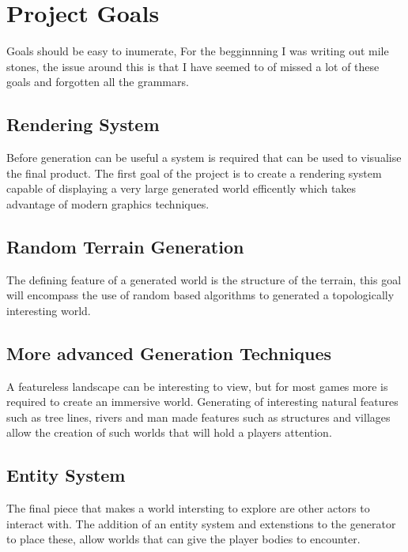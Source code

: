 \section{Project Goals}

Goals should be easy to inumerate, For the begginnning I was writing out mile
stones, the issue around this is that I have seemed to of missed a lot of these
goals and forgotten all the grammars.\\

\subsection{Rendering System}
Before generation can be useful a system is required that can be used to 
visualise the final product. The first goal of the project is to create a
rendering system capable of displaying a very large generated world efficently 
which takes advantage of modern graphics techniques.\\

\subsection{Random Terrain Generation}
The defining feature of a generated world is the structure of the terrain, this
goal will encompass the use of random based algorithms to generated a 
topologically interesting world.\\

\subsection{More advanced Generation Techniques}
A featureless landscape can be interesting to view, but for most games more is 
required to create an immersive world. Generating of interesting natural features
such as tree lines, rivers and man made features such as structures and villages
allow the creation of such worlds that will hold a players attention.

\subsection{Entity System}
The final piece that makes a world intersting to explore are other actors to 
interact with. The addition of an entity system and extenstions to the generator
to place these, allow worlds that can give the player bodies to encounter.
